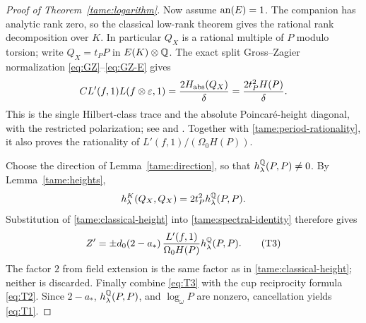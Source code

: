 \begin{proof}[Proof of Theorem~\ref{tame:logarithm}]
Now assume \(\operatorname{an}(E)=1\). The companion has analytic rank zero,
so the classical low-rank theorem gives the rational rank
decomposition over \(K\). In particular \(Q_X\) is a rational
multiple of \(P\) modulo torsion; write \(Q_X=t_P P\) in
\(E(K)\otimes\mathbb Q\). The exact split Gross--Zagier normalization
\eqref{eq:GZ}--\eqref{eq:GZ-E} gives
\begin{equation}\label{tame:classical-height}
 C L'(f,1)L(f\otimes\varepsilon,1)
       =\frac{2H_{\rm abs}(Q_X)}{\delta}
       =\frac{2t_P^2H(P)}{\delta}.
\end{equation}
This is the single Hilbert-class trace and the absolute
Poincaré-height diagonal, with the restricted polarization;
see \cite[Chapters~I and V]{GZ86} and \cite{CST14}.
Together with \eqref{tame:period-rationality}, it also proves
the rationality of \(L'(f,1)/(\Omega_0H(P))\).

Choose the direction of Lemma~\ref{tame:direction}, so that
\(h_\lambda^\mathbb Q(P,P)\ne0\). By Lemma~\ref{tame:heights},
\[
 h_\lambda^K(Q_X,Q_X)=2t_P^2h_\lambda^\mathbb Q(P,P).
\]
Substitution of \eqref{tame:classical-height} into
\eqref{tame:spectral-identity} therefore gives
\[
 Z'=\pm d_0(2-a_*)\,
       \frac{L'(f,1)}{\Omega_0H(P)}
          h_\lambda^\mathbb Q(P,P).
 \tag{T3}\label{eq:T3}
\]
The factor \(2\) from field extension is the same factor as
in \eqref{tame:classical-height}; neither is discarded.
Finally combine \eqref{eq:T3} with the cup reciprocity formula
\eqref{eq:T2}. Since \(2-a_*\), \(h_\lambda^\mathbb Q(P,P)\), and
\(\log_\omega P\) are nonzero, cancellation yields
\eqref{eq:T1}.
\end{proof}
